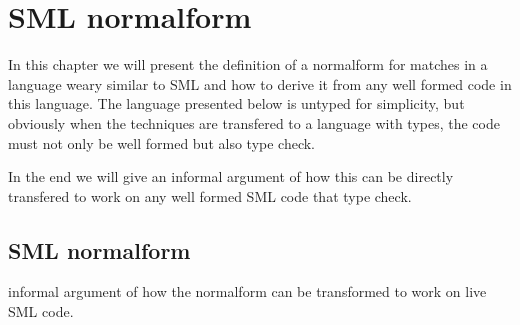 \chapter{SML normalform}

In this chapter we will present the definition of a normalform for matches in a
language weary similar to SML and how to derive it from any well formed code in
this language. The language presented below is untyped for simplicity, but
obviously when the techniques are transfered to a language with types, the code
must not only be well formed but also type check.

In the end we will give an informal argument of how this can be directly
transfered to work on any well formed SML code that type check.



\section{SML normalform}

informal argument of how the normalform can be transformed to work on live SML code.



